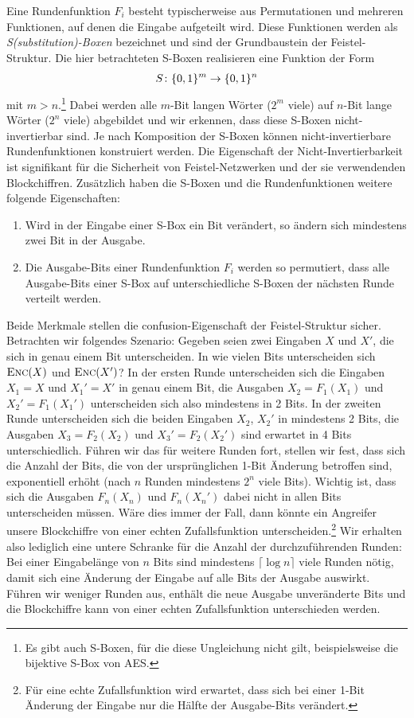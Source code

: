 Eine Rundenfunktion \(F_i\) besteht typischerweise aus Permutationen und mehreren Funktionen, auf denen die Eingabe aufgeteilt wird. Diese Funktionen werden als \textit{S(substitution)-Boxen} bezeichnet und sind der Grundbaustein der Feistel-Struktur. Die hier betrachteten S-Boxen realisieren eine Funktion der Form
\begin{align*}
	S \colon \{0, 1\}^m \rightarrow \{0, 1\}^n
\end{align*}
mit \(m > n\).\footnote{Es gibt auch S-Boxen, für die diese Ungleichung nicht gilt, beispielsweise die bijektive S-Box von AES.} Dabei werden alle $m$-Bit langen Wörter (\(2^m\) viele) auf $n$-Bit lange Wörter (\(2^n\) viele) abgebildet und wir erkennen, dass diese S-Boxen nicht-invertierbar sind. Je nach Komposition der S-Boxen können nicht-invertierbare Rundenfunktionen konstruiert werden. Die Eigenschaft der Nicht-Invertierbarkeit ist signifikant für die Sicherheit von Feistel-Netzwerken und der sie verwendenden Blockchiffren. Zusätzlich haben die S-Boxen und die Rundenfunktionen weitere folgende Eigenschaften:
\begin{enumerate}
	\item Wird in der Eingabe einer S-Box ein Bit verändert, so ändern sich mindestens zwei Bit in der Ausgabe.
	\item Die Ausgabe-Bits einer Rundenfunktion $F_i$ werden so permutiert, dass alle Ausgabe-Bits einer S-Box auf unterschiedliche S-Boxen der nächsten Runde verteilt werden.
\end{enumerate}
Beide Merkmale stellen die confusion-Eigenschaft der Feistel-Struktur sicher. 
Betrachten wir folgendes Szenario: Gegeben seien zwei Eingaben $X$ und $X'$, die sich in genau einem Bit unterscheiden. In wie vielen Bits unterscheiden sich $\textsc{Enc}(X)$ und $\textsc{Enc}(X')$? In der ersten Runde unterscheiden sich die Eingaben $X_1 = X$ und $X_1' = X'$ in genau einem Bit, die Ausgaben $X_2 = F_1(X_1)$ und $X_2' = F_1(X_1')$ unterscheiden sich also mindestens in 2 Bits. In der zweiten Runde unterscheiden sich die beiden Eingaben $X_2$, $X_2'$ in mindestens 2 Bits, die Ausgaben $X_3 = F_2(X_2)$ und $X_3' = F_2(X_2')$ sind erwartet in 4 Bits unterschiedlich. Führen wir das für weitere Runden fort, stellen wir fest, dass sich die Anzahl der Bits, die von der ursprünglichen 1-Bit Änderung betroffen sind, exponentiell erhöht (nach $n$ Runden mindestens $2^n$ viele Bits).
Wichtig ist, dass sich die Ausgaben $F_n(X_n)$ und $F_n(X_n')$ dabei nicht in allen Bits unterscheiden müssen. Wäre dies immer der Fall, dann könnte ein Angreifer unsere Blockchiffre von einer echten Zufallsfunktion unterscheiden.\footnote{Für eine echte Zufallsfunktion wird erwartet, dass sich bei einer 1-Bit Änderung der Eingabe nur die Hälfte der Ausgabe-Bits verändert.} Wir erhalten also lediglich eine untere Schranke für die Anzahl der durchzuführenden Runden: Bei einer Eingabelänge von $n$ Bits sind mindestens $ \lceil \log n \rceil$ viele Runden nötig, damit sich eine Änderung der Eingabe auf alle Bits der Ausgabe auswirkt. Führen wir weniger Runden aus, enthält die neue Ausgabe unveränderte Bits und die Blockchiffre kann von einer echten Zufallsfunktion unterschieden werden.


